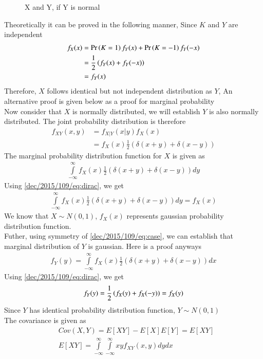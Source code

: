 \begin{enumerate}
\begin{figure}[!ht]
\caption{X and Y, if Y is normal}
\label{fig:dec/2015/109/plot}
\end{figure}
Theoretically it can be proved in the following manner,
Since $K$ and $Y$ are independent
\begin{align}
f_X(x)&=\Pr\left(K=1\right)f_Y(x)+\Pr\left(K=-1\right)f_Y(-x)\\
&=\frac{1}{2}\left(f_Y(x)+f_Y(-x)\right)\\
&=f_Y(x)
\end{align}
Therefore, $X$ follows identical but not independent distribution as $Y$, An alternative proof is given below as a proof for marginal probability\\
Now consider that $X$ is normally distributed, we will establish $Y$ is also normally distributed.
The joint probability distribution is therefore
\begin{align}
f_{XY}(x,y)&=f_{X|Y}(x|y)f_X(x)\nonumber \\
&=f_X(x)\frac{1}{2}(\delta(x+y)+\delta(x-y))\label{dec/2015/109/eq:counter}
\end{align}
The marginal probability distribution function for $X$ is given as
\begin{align}
\int\limits_{-\infty}^{\infty}f_X(x)\frac{1}{2}(\delta(x+y)+\delta(x-y)) dy
\end{align}
Using \eqref{dec/2015/109/eq:dirac}, we get
\begin{align}
\int\limits_{-\infty}^{\infty}f_X(x)\frac{1}{2}(\delta(x+y)+\delta(x-y))dy=f_X(x)
\end{align}
We know that $X\sim N(0,1)$, $f_X(x)$ represents gaussian probability distribution function.\\
Futher, using symmetry of \eqref{dec/2015/109/eq:case}, we can establish that marginal distribution of $Y$ is gaussian. Here is a proof anyways
\begin{align}
f_Y(y)=\int\limits_{-\infty}^{\infty}f_X(x)\frac{1}{2}(\delta(x+y)+\delta(x-y)) dx
\end{align}
Using \eqref{dec/2015/109/eq:dirac}, we get
\begin{align}
f_Y(y)=\frac{1}{2}\left(f_X(y)+f_X(-y)\right)=f_X(y)
\end{align}
Since $Y$ has identical probability distribution function, $Y\sim N(0,1)$\\
The covariance is given as
\begin{align}
&Cov(X,Y)=E[XY]-E[X]E[Y]=E[XY]\\
&E[XY]=\int\limits_{-\infty}^{\infty}\int\limits_{-\infty}^{\infty}xyf_{XY}(x,y) dy dx
\end{align}

\end{enumerate}
